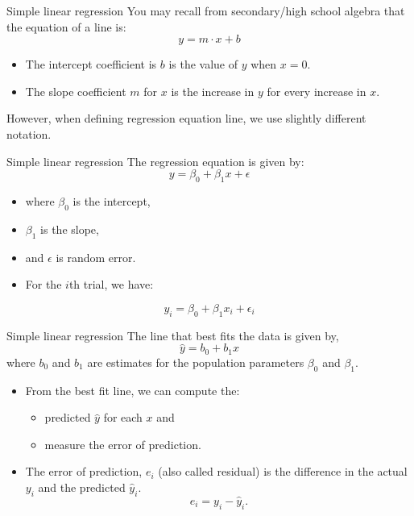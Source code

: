 \documentclass[
  ignorenonframetext,
]{beamer}
\providecommand{\tightlist}{%
  \setlength{\itemsep}{0pt}\setlength{\parskip}{0pt}}
\begin{document}
\begin{frame}{Simple linear regression}
\protect\hypertarget{simple-linear-regression-1}{}
You may recall from secondary/high school algebra that the equation of a
line is: \[y=m\cdot x + b\]

\begin{itemize}
\item
  The intercept coefficient is \(b\) is the value of \(y\) when \(x=0\).
\item
  The slope coefficient \(m\) for \(x\) is the increase in \(y\) for
  every increase in \(x\).
\end{itemize}

However, when defining regression equation line, we use slightly
different notation.
\end{frame}

\begin{frame}{Simple linear regression}
\protect\hypertarget{simple-linear-regression-2}{}
The regression equation is given by: \[y=\beta_0+\beta_1x+\epsilon\]

\begin{itemize}
\item
  where \(\beta_0\) is the intercept,
\item
  \(\beta_1\) is the slope,
\item
  and \(\epsilon\) is random error.
\item
  For the \(i\)th trial, we have:
\end{itemize}

\[y_i=\beta_0+\beta_1x_i+\epsilon_i\]
\end{frame}

\begin{frame}{Simple linear regression}
\protect\hypertarget{simple-linear-regression-3}{}
The line that best fits the data is given by, \[\hat{y}=b_0+b_1x\] where
\(b_0\) and \(b_1\) are estimates for the population parameters
\(\beta_0\) and \(\beta_1\).

\begin{itemize}
\item
  From the best fit line, we can compute the:

  \begin{itemize}
  \tightlist
  \item
    predicted \(\hat{y}\) for each \(x\) and
  \item
    measure the error of prediction.
  \end{itemize}
\item
  The error of prediction, \(e_i\) (also called residual) is the
  difference in the actual \(y_i\) and the predicted \(\hat{y}_i\).
  \[e_i=y_i-\hat{y}_i.\]
\end{itemize}
\end{frame}
\end{document}
